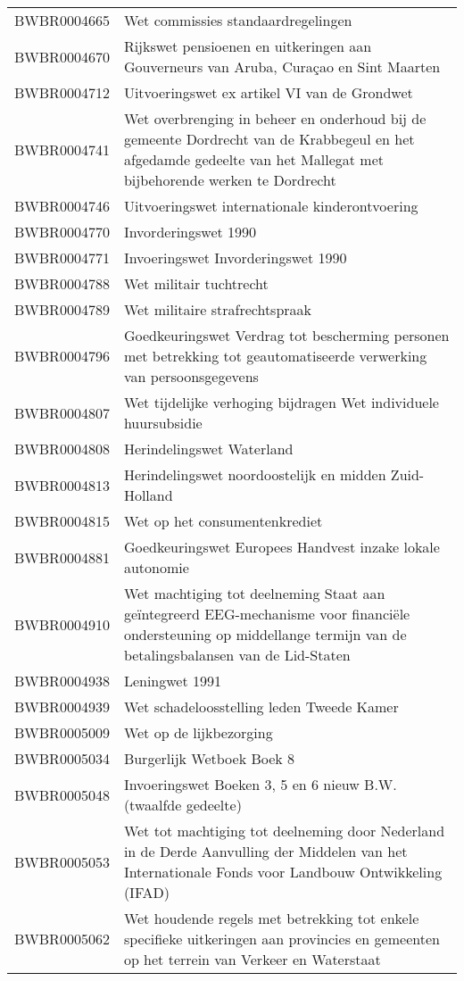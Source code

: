 \begin{longtable}{lp{}}
BWBR0004665 & Wet commissies standaardregelingen \\
BWBR0004670 & Rijkswet pensioenen en uitkeringen aan Gouverneurs van Aruba, Curaçao en Sint Maarten \\
BWBR0004712 & Uitvoeringswet ex artikel VI van de Grondwet \\
BWBR0004741 & Wet overbrenging in beheer en onderhoud bij de gemeente Dordrecht van de Krabbegeul en het afgedamde gedeelte van het Mallegat met bijbehorende werken te Dordrecht \\
BWBR0004746 & Uitvoeringswet internationale kinderontvoering \\
BWBR0004770 & Invorderingswet 1990 \\
BWBR0004771 & Invoeringswet Invorderingswet 1990 \\
BWBR0004788 & Wet militair tuchtrecht \\
BWBR0004789 & Wet militaire strafrechtspraak \\
BWBR0004796 & Goedkeuringswet Verdrag tot bescherming personen met betrekking tot geautomatiseerde verwerking van persoonsgegevens \\
BWBR0004807 & Wet tijdelijke verhoging bijdragen Wet individuele huursubsidie \\
BWBR0004808 & Herindelingswet Waterland \\
BWBR0004813 & Herindelingswet noordoostelijk en midden Zuid-Holland \\
BWBR0004815 & Wet op het consumentenkrediet \\
BWBR0004881 & Goedkeuringswet Europees Handvest inzake lokale autonomie \\
BWBR0004910 & Wet machtiging tot deelneming Staat aan geïntegreerd EEG-mechanisme voor financiële ondersteuning op middellange termijn van de betalingsbalansen van de Lid-Staten \\
BWBR0004938 & Leningwet 1991 \\
BWBR0004939 & Wet schadeloosstelling leden Tweede Kamer \\
BWBR0005009 & Wet op de lijkbezorging \\
BWBR0005034 & Burgerlijk Wetboek Boek 8 \\
BWBR0005048 & Invoeringswet Boeken 3, 5 en 6 nieuw B.W. (twaalfde gedeelte) \\
BWBR0005053 & Wet tot machtiging tot deelneming door Nederland in de Derde Aanvulling der Middelen van het Internationale Fonds voor Landbouw Ontwikkeling (IFAD) \\
BWBR0005062 & Wet houdende regels met betrekking tot enkele specifieke uitkeringen aan provincies en gemeenten op het terrein van Verkeer en Waterstaat \\

\end{longtable}
